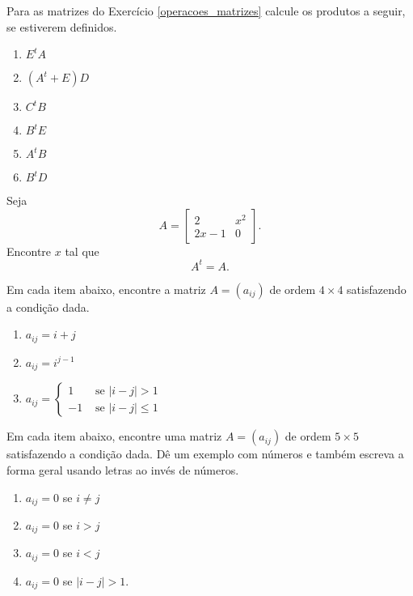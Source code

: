 \documentclass[12pt]{exam}
\begin{document}
    \questao{}Para as matrizes do Exercício \ref{operacoes_matrizes} calcule os produtos a seguir, se estiverem definidos.
    \begin{enumerate}[label={\alph*})]
        \item $E^tA$
        \item $(A^t + E)D$
        \item $C^tB$
        \item $B^tE$
        \item $A^tB$
        \item $B^tD$
    \end{enumerate}
    \questao{} Seja
    \[
        A = \begin{bmatrix}2 & x^2\\2x - 1 & 0\end{bmatrix}.
    \]
    Encontre $x$ tal que
    \[
        A^t = A.
    \]

    \vspace{.3cm}
    
    \questao{} Em cada item abaixo, encontre a matriz $A = (a_{ij})$ de ordem $4 \times 4$ satisfazendo a condição dada.
    \begin{enumerate}[label={\alph*})]
        \item $a_{ij} = i + j$
        \item $a_{ij} = i^{j - 1}$
        \item $a_{ij} = \begin{cases}1 & \mbox{ se } |i - j| > 1\\-1 & \mbox{ se } |i - j| \le 1\end{cases}$
    \end{enumerate}
    
    \vspace{.3cm}

    \questao{} Em cada item abaixo, encontre uma matriz $A = (a_{ij})$ de ordem $5 \times 5$ satisfazendo a condição dada. Dê um exemplo com números e também escreva a forma geral usando letras ao invés de números.
    \begin{enumerate}[label={\alph*})]
        \item $a_{ij} = 0$ se $i \ne j$
        \item $a_{ij} = 0$ se $i > j$
        \item $a_{ij} = 0$ se $i < j$
        \item $a_{ij} = 0$ se $|i - j| > 1$.
    \end{enumerate}
    \vspace{.3cm}
\end{document}
